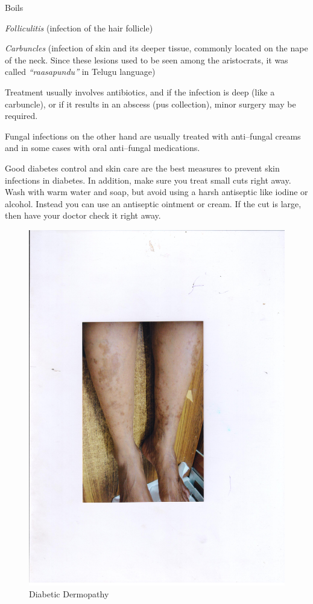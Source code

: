 { \item Boils

 \item \textit{Folliculitis} (infection of the hair follicle)

 \item \textit{Carbuncles} (infection of skin and its deeper tissue, commonly located on the nape of the neck. Since these lesions used to be seen among the aristocrats, it was called \textit{“raasapundu”} in Telugu language)

Treatment usually involves antibiotics, and if the infection is deep (like a carbuncle), or if it results in an abscess (pus collection), minor surgery may be required.

Fungal infections on the other hand are usually treated with anti–fungal creams and in some cases with oral anti–fungal medications.

Good diabetes control and skin care are the best measures to prevent skin infections in diabetes. In addition, make sure you treat small cuts right away. Wash with warm water and soap, but avoid using a harsh antiseptic like iodine or alcohol. Instead you can use an antiseptic ointment or cream. If the cut is large, then have your doctor check it right away.

\begin{figure}
\includegraphics{images/072.jpg}
\caption{Diabetic Dermopathy}
\end{figure}

}
